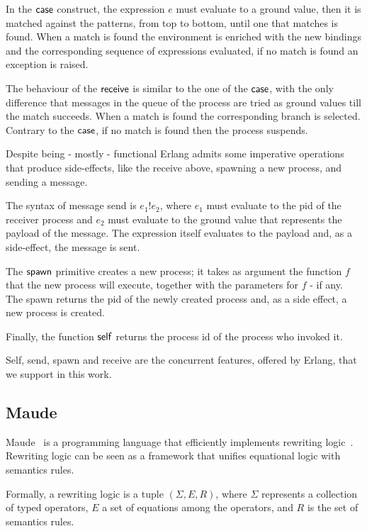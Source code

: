 \documentclass{article}[12pt,a4paper]
\theoremstyle{definition}
\begin{document}
In the $\mathsf{case}$ construct, the expression $e$ must evaluate to a ground value, then it is matched against the patterns, from
top to bottom, until one that matches is found. When a match is found the environment
is enriched with the new bindings and the corresponding sequence of expressions evaluated, if
no match is found an exception is raised.

The behaviour of the $\mathsf{receive}$ is similar to the one of the
$\mathsf{case}$, with the only difference that messages in the queue of
the process are tried as ground values till the match succeeds.
When a match is found the corresponding branch
is selected.  Contrary to the $\mathsf{case}$, if no match is found
then the process suspends.

Despite being - mostly - functional Erlang
admits some imperative operations that produce side-effects, like the receive
above, spawning a new process, and sending a message. 

The syntax of message send is $e_1!e_2$, where $e_1$ must
evaluate to the pid of the receiver process and $e_2$ must evaluate to the ground value that represents the payload of the message. The expression itself evaluates to
the payload and, as a side-effect, the message is sent.

The $\mathsf{spawn}$ primitive creates a new process; it takes as argument
the function $f$ that the new process will execute, together with the
parameters for $f$ - if any. The spawn returns the
pid of the newly created process and, as a side effect, a new process is created.

Finally, the function $\mathsf{self}$ returns the process id of the process
who invoked it.

Self, send, spawn and receive are the concurrent features, offered by Erlang, that we support in this work.

\subsection{Maude}

Maude~\cite{maude} is a programming language that efficiently implements rewriting logic~\cite{MeseguerMS96}.
Rewriting logic can be seen as a framework that unifies equational
logic with semantics rules.

Formally, a rewriting logic is a tuple $(\Sigma, E, R)$, where $\Sigma$
represents a collection of typed operators, $E$ a set of equations among the operators, and $R$ is the set of
semantics rules.
\end{document}
